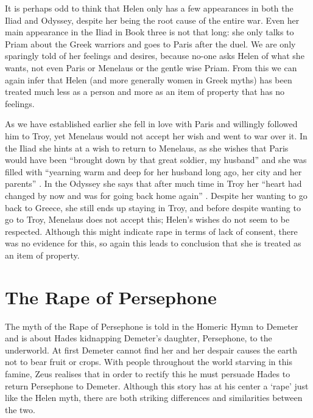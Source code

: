 \documentclass[11pt]{article}
\begin{document}
It is perhaps odd to think that Helen only has a few appearances in both the Iliad and Odyssey, despite her being the root cause of the entire war.
Even her main appearance in the Iliad in Book three is not that long: she only talks to Priam about the Greek warriors and goes to Paris after the duel.
We are only sparingly told of her feelings and desires, because no-one asks Helen of what she wants, not even Paris or Menelaus or the gentle wise Priam.
From this we can again infer that Helen (and more generally women in Greek myths) has been treated much less as a person and more as an item of property that has no feelings.

As we have established earlier she fell in love with Paris and willingly followed him to Troy, yet Menelaus would not accept her wish and went to war over it.
In the Iliad she hints at a wish to return to Menelaus, as she wishes that Paris would have been ``brought down by that great soldier, my husband'' and she was filled with ``yearning warm and deep for her husband long ago, her city and her parents'' \cite[book 1, line 500/168]{iliad}.
In the Odyssey she says that after much time in Troy her ``heart had changed by now and was for going back home again'' \cite[book 11, line 260]{odyssey}.
Despite her wanting to go back to Greece, she still ends up staying in Troy, and before despite wanting to go to Troy, Menelaus does not accept this; Helen's wishes do not seem to be respected.
Although this might indicate rape in terms of lack of consent, there was no evidence for this, so again this leads to conclusion that she is treated as an item of property.


\section{The Rape of Persephone}
The myth of the Rape of Persephone is told in the Homeric Hymn to Demeter and is about Hades kidnapping Demeter's daughter, Persephone, to the underworld.
At first Demeter cannot find her and her despair causes the earth not to bear fruit or crops.
With people throughout the world starving in this famine, Zeus realises that in order to rectify this he must persuade Hades to return Persephone to Demeter.
Although this story has at his center a `rape' just like the Helen myth, there are both striking differences and similarities between the two.
 
\end{document}
